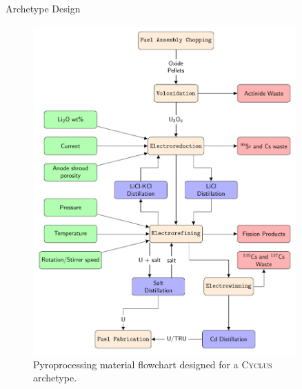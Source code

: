 \documentclass[final]{beamer}
\newlength{\sepwid}
\newlength{\onecolwid}
\newlength{\threecolwid}
\newcommand{\Cyclus}{\textsc{Cyclus}\xspace}%
\begin{document}
\begin{frame}[t]
\begin{columns}[t,totalwidth=\threecolwid]
\begin{column}{\onecolwid}
\begin{block}{Archetype Design}
\begin{figure}
	\includegraphics[width=1\linewidth]{flowchart}
	\caption{Pyroprocessing material flowchart designed for a \Cyclus archetype.}
\end{figure}

\end{block}


\end{column} %

\begin{column}{\sepwid}\end{column} %

\begin{column}{\onecolwid} %
	


\end{column}
\end{columns}
\end{frame}
\end{document}
